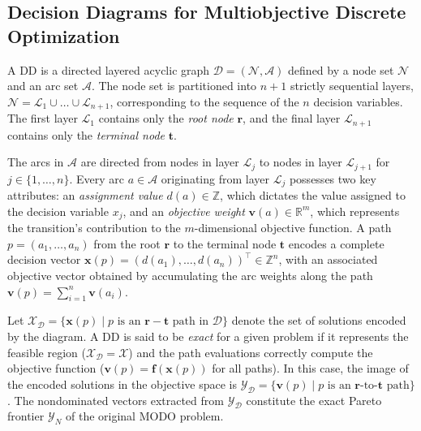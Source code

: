 \documentclass[letterpaper]{article}
\begin{document}
\subsection{Decision Diagrams for Multiobjective Discrete Optimization}
\label{sec:prelim_dd}


A DD is a directed layered acyclic graph $\mathcal{D} = (\mathcal{N}, \mathcal{A})$ defined by a node set $\mathcal{N}$ and an arc set $\mathcal{A}$. The node set is partitioned into $n+1$ strictly sequential layers, $\mathcal{N} = \mathcal{L}_1 \cup \dots \cup \mathcal{L}_{n+1}$, corresponding to the sequence of the $n$ decision variables. The first layer $\mathcal{L}_1$ contains only the \emph{root node} $\mathbf{r}$, and the final layer $\mathcal{L}_{n+1}$ contains only the \emph{terminal node} $\mathbf{t}$.

The arcs in $\mathcal{A}$ are directed from nodes in layer $\mathcal{L}_j$ to nodes in layer $\mathcal{L}_{j+1}$ for $j \in \{1, \dots, n\}$. Every arc $a \in \mathcal{A}$ originating from layer $\mathcal{L}_j$ possesses two key attributes: an \emph{assignment value} $d(a) \in \mathbb{Z}$, which dictates the value assigned to the decision variable $x_j$, and an \emph{objective weight} $\mathbf{v}(a) \in \mathbb{R}^m$, which represents the transition's contribution to the $m$-dimensional objective function. A path $p = (a_1, \dots, a_n)$ from the root $\mathbf{r}$ to the terminal node $\mathbf{t}$ encodes a complete decision vector $\mathbf{x}(p) = (d(a_1), \dots, d(a_n))^\top \in \mathbb{Z}^n$, with an associated objective vector obtained by accumulating the arc weights along the path $\mathbf{v}(p) = \sum_{i=1}^n \mathbf{v}(a_i)$.


Let $\mathcal{X}_{\mathcal{D}} = \{ \mathbf{x}(p) \mid p \text{ is an } \mathbf{r}-\mathbf{t} \text{ path in } \mathcal{D} \}$ denote the set of solutions encoded by the diagram. A DD is said to be \emph{exact} for a given problem if it represents the feasible region ($\mathcal{X}_{\mathcal{D}} = \mathcal{X}$) and the path evaluations correctly compute the objective function ($\mathbf{v}(p) = \mathbf{f}(\mathbf{x}(p))$ for all paths). In this case, the image of the encoded solutions in the objective space is $\mathcal{Y}_{\mathcal{D}} = \{ \mathbf{v}(p) \mid p \text{ is an } \mathbf{r}\text{-to-}\mathbf{t} \text{ path} \}$. The nondominated vectors extracted from $\mathcal{Y}_{\mathcal{D}}$ constitute the exact Pareto frontier $\mathcal{Y}_N$ of the original MODO problem.
\end{document}
